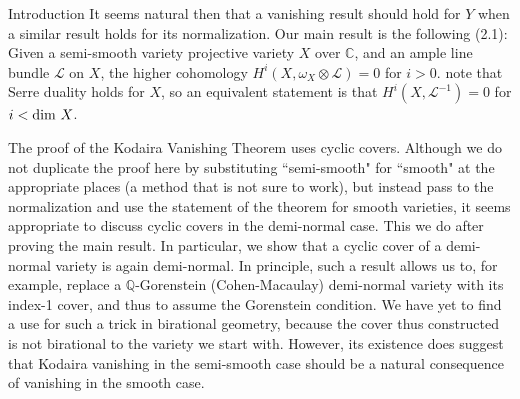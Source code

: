 \documentclass{article}
\begin{document}
\begin{section}{Introduction}
It seems natural then that a vanishing result should hold for $Y$ when a similar result holds for its normalization.  Our main result is the following (2.1):  Given a semi-smooth variety projective variety $X$ over $\mathbb{C}$, and an ample line bundle $\mathcal{L}$ on $X$, the higher cohomology $H^i(X, \omega_X \otimes \mathcal{L}) =0$ for $i>0$.  note that Serre duality holds for $X$, so an equivalent statement is that $H^i(X, \mathcal{L}^{-1}) = 0$ for $i < \textnormal{dim } X$.

The proof of the Kodaira Vanishing Theorem uses cyclic covers.  Although we do not duplicate the proof here by substituting ``semi-smooth" for ``smooth" at the appropriate places (a method that is not sure to work), but instead pass to the normalization and use the statement of the theorem for smooth varieties, it seems appropriate to discuss cyclic covers in the demi-normal case.  This we do after proving the main result.  In particular, we show that a cyclic cover of a demi-normal variety is again demi-normal.  In principle, such a result allows us to, for example, replace a $\mathbb{Q}$-Gorenstein (Cohen-Macaulay) demi-normal variety with its index-1 cover, and thus to assume the Gorenstein condition.  We have yet to find a use for such a trick in birational geometry, because the cover thus constructed is not birational to the variety we start with.  However, its existence does suggest that Kodaira vanishing in the semi-smooth case should be a natural consequence of vanishing in the smooth case.

\end{section}
\end{document}
